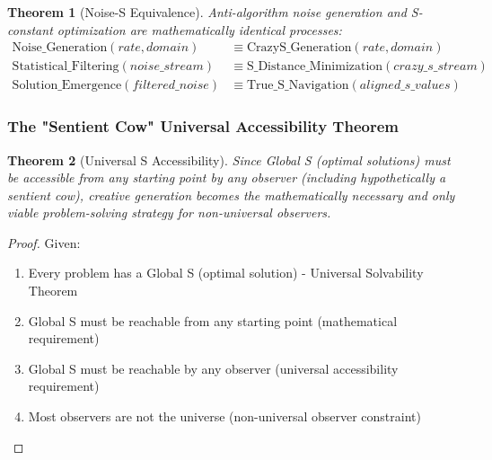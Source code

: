 \documentclass[12pt,a4paper]{article}
\newtheorem{theorem}{Theorem}[section]
\begin{document}
{\begin{theorem}[Noise-S Equivalence]
Anti-algorithm noise generation and S-constant optimization are mathematically identical processes:
\begin{align}
\text{Noise\_Generation}(rate, domain) &\equiv \text{CrazyS\_Generation}(rate, domain) \\
\text{Statistical\_Filtering}(noise\_stream) &\equiv \text{S\_Distance\_Minimization}(crazy\_s\_stream) \\
\text{Solution\_Emergence}(filtered\_noise) &\equiv \text{True\_S\_Navigation}(aligned\_s\_values)
\end{align}
\end{theorem}

\subsubsection{The "Sentient Cow" Universal Accessibility Theorem}

\begin{theorem}[Universal S Accessibility]
Since Global S (optimal solutions) must be accessible from any starting point by any observer (including hypothetically a sentient cow), creative generation becomes the mathematically necessary and only viable problem-solving strategy for non-universal observers.
\end{theorem}

\begin{proof}
Given:
\begin{enumerate}
\item Every problem has a Global S (optimal solution) - Universal Solvability Theorem
\item Global S must be reachable from any starting point (mathematical requirement)
\item Global S must be reachable by any observer (universal accessibility requirement)
\item Most observers are not the universe (non-universal observer constraint)
\end{enumerate}


\end{proof}}
\end{document}
